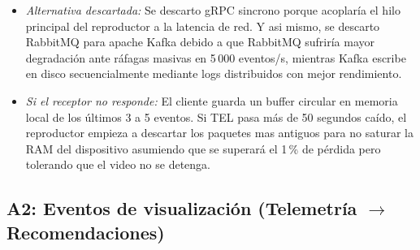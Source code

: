 \begin{itemize}
\begin{itemize}
        \item \textit{Alternativa descartada:}
        Se descarto gRPC sincrono porque acoplaría el hilo principal del reproductor a la latencia de red. Y asi mismo, se descarto RabbitMQ para apache Kafka debido a que RabbitMQ
        sufriría mayor degradación ante ráfagas masivas en 5\,000 eventos/s, mientras Kafka escribe en disco secuencialmente mediante logs distribuidos con mejor rendimiento.

        \item \textit{Si el receptor no responde:}
        El cliente guarda un buffer circular en memoria local de los últimos 3 a 5 eventos. Si TEL pasa más de 50 segundos caído, el reproductor empieza a descartar los paquetes mas antiguos para no saturar la RAM del dispositivo
        asumiendo que se superará el 1\,\% de pérdida pero tolerando que el video no se detenga.
         
    \end{itemize}
\end{itemize}

\subsection{A2: Eventos de visualización (Telemetría $\rightarrow$ Recomendaciones)}
\label{sub:a2}

